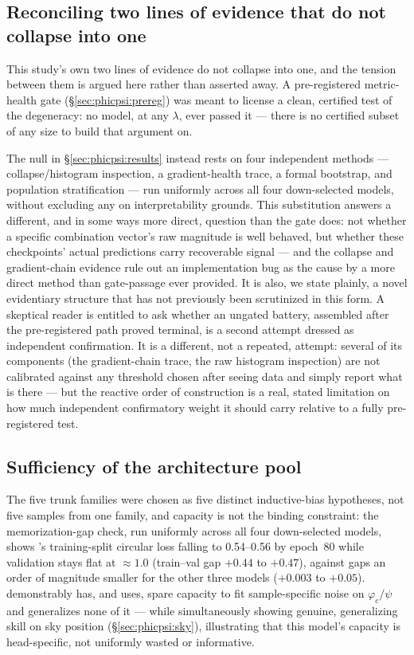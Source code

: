 \subsection{Reconciling two lines of evidence that do not collapse into one}
\label{sec:phicpsi:reconcile}

This study's own two lines of evidence do not collapse into one, and the tension between them is argued here rather than asserted away.
A pre-registered metric-health gate (\S\ref{sec:phicpsi:prereg}) was meant to license a clean, certified test of the degeneracy: no model, at any $\lambda$, ever passed it --- there is no certified subset of any size to build that argument on.

The null in \S\ref{sec:phicpsi:results} instead rests on four independent methods --- collapse/histogram inspection, a gradient-health trace, a formal bootstrap, and population stratification --- run uniformly across all four down-selected models, without excluding any on interpretability grounds.
This substitution answers a different, and in some ways more direct, question than the gate does: not whether a specific combination vector's raw magnitude is well behaved, but whether these checkpoints' actual predictions carry recoverable signal --- and the collapse and gradient-chain evidence rule out an implementation bug as the cause by a more direct method than gate-passage ever provided.
It is also, we state plainly, a novel evidentiary structure that has not previously been scrutinized in this form.
A skeptical reader is entitled to ask whether an ungated battery, assembled after the pre-registered path proved terminal, is a second attempt dressed as independent confirmation.
It is a different, not a repeated, attempt: several of its components (the gradient-chain trace, the raw histogram inspection) are not calibrated against any threshold chosen after seeing data and simply report what is there --- but the reactive order of construction is a real, stated limitation on how much independent confirmatory weight it should carry relative to a fully pre-registered test.

\subsection{Sufficiency of the architecture pool}
\label{sec:phicpsi:pool}

The five trunk families were chosen as five distinct inductive-bias hypotheses, not five samples from one family, and capacity is not the binding constraint: the memorization-gap check, run uniformly across all four down-selected models, shows \cnnAttn's training-split circular loss falling to 0.54--0.56 by epoch~80 while validation stays flat at $\approx1.0$ (train--val gap $+0.44$ to $+0.47$), against gaps an order of magnitude smaller for the other three models ($+0.003$ to $+0.05$).
\cnnAttn demonstrably has, and uses, spare capacity to fit sample-specific noise on $\varphi_c/\psi$ and generalizes none of it --- while simultaneously showing genuine, generalizing skill on sky position (\S\ref{sec:phicpsi:sky}), illustrating that this model's capacity is head-specific, not uniformly wasted or informative.

